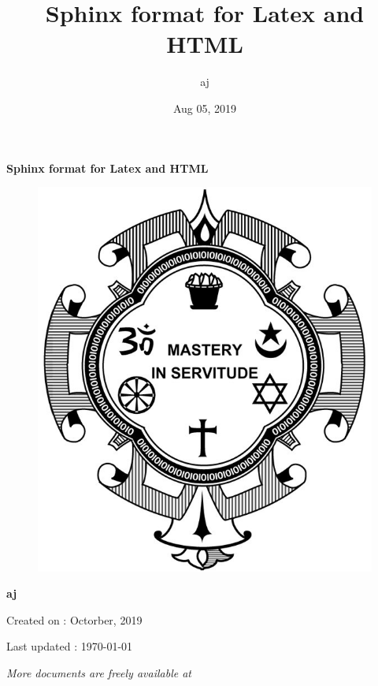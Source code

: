\documentclass[a4paper,10pt,english]{report}
\title{Sphinx format for Latex and HTML}
\date{Aug 05, 2019}
\author{aj}
\begin{document}
\pagestyle{empty}


        \begin{titlepage}
            \centering

            \vspace*{40mm} %
            \textbf{\Huge {Sphinx format for Latex and HTML}}

            \vspace{0mm}
            \begin{figure}[!h]
                \centering
                \includegraphics[scale=0.3]{logo.jpg}
            \end{figure}

            \vspace{0mm}
            \Large \textbf{{aj}}

            \small Created on : Octorber, 2019

            \vspace*{0mm}
            \small  Last updated : \MonthYearFormat\today


            \vfill
            \small \textit{More documents are freely available at }
        \end{titlepage}
\end{document}
